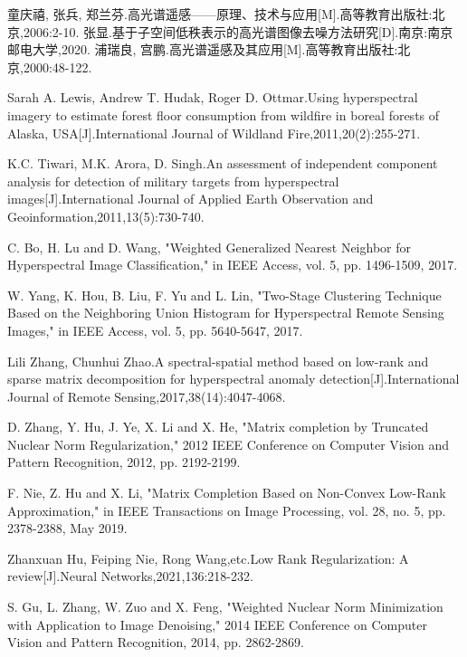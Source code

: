 \documentclass[12pt, a4paper]{article}
\begin{document}
\newpage
\begin{thebibliography}{99}
童庆禧, 张兵, 郑兰芬.高光谱遥感——原理、技术与应用[M].高等教育出版社:北京,2006:2-10.
张显.基于子空间低秩表示的高光谱图像去噪方法研究[D].南京:南京邮电大学,2020.
浦瑞良, 宫鹏.高光谱遥感及其应用[M].高等教育出版社:北京,2000:48-122.
		
Sarah A. Lewis, Andrew T. Hudak, Roger D. Ottmar.Using hyperspectral imagery to estimate forest floor consumption from wildfire in boreal forests of Alaska, USA[J].International Journal of Wildland Fire,2011,20(2):255-271.
		
K.C. Tiwari, M.K. Arora, D. Singh.An assessment of independent component analysis for detection of military targets from hyperspectral images[J].International Journal of Applied Earth Observation and Geoinformation,2011,13(5):730-740.
		
C. Bo, H. Lu and D. Wang, "Weighted Generalized Nearest Neighbor for Hyperspectral Image Classification," in IEEE Access, vol. 5, pp. 1496-1509, 2017.
		
W. Yang, K. Hou, B. Liu, F. Yu and L. Lin, "Two-Stage Clustering Technique Based on the Neighboring Union Histogram for Hyperspectral Remote Sensing Images," in IEEE Access, vol. 5, pp. 5640-5647, 2017.
		
Lili Zhang, Chunhui Zhao.A spectral-spatial method based on low-rank and sparse matrix decomposition for hyperspectral anomaly detection[J].International Journal of Remote Sensing,2017,38(14):4047-4068.
		
D. Zhang, Y. Hu, J. Ye, X. Li and X. He, "Matrix completion by Truncated Nuclear Norm Regularization," 2012 IEEE Conference on Computer Vision and Pattern Recognition, 2012, pp. 2192-2199.
		
F. Nie, Z. Hu and X. Li, "Matrix Completion Based on Non-Convex Low-Rank Approximation," in IEEE Transactions on Image Processing, vol. 28, no. 5, pp. 2378-2388, May 2019.
		
Zhanxuan Hu, Feiping Nie, Rong Wang,etc.Low Rank Regularization: A review[J].Neural Networks,2021,136:218-232.
		
S. Gu, L. Zhang, W. Zuo and X. Feng, "Weighted Nuclear Norm Minimization with Application to Image Denoising," 2014 IEEE Conference on Computer Vision and Pattern Recognition, 2014, pp. 2862-2869. %
		

\end{thebibliography}
\end{document}
